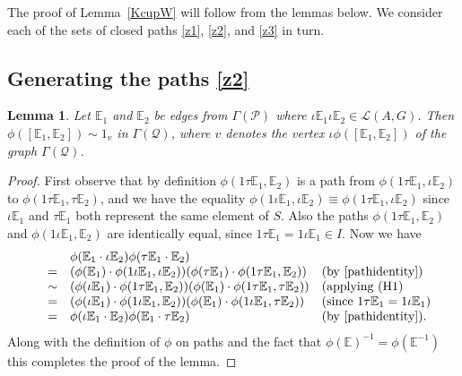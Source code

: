 \documentclass[11pt]{amsart}
\newtheorem{lem}{Lemma}
\theoremstyle{plain}
\begin{document}
The proof of Lemma~\ref{KcupW} will follow from the lemmas below. We consider each of the sets of closed paths \eqref{z1}, \eqref{z2}, and \eqref{z3} in turn.

\subsection*{Generating the paths \eqref{z2}}

\begin{lem}\label{type2}
Let ${\mathbb{E}}_1$ and ${\mathbb{E}}_2$ be edges from $\Gamma(\mathcal{P})$ where $\iota {\mathbb{E}}_1 \iota {\mathbb{E}}_2 \in {\mathcal{L}({A,G})}$. Then  $\phi([{\mathbb{E}}_1, {\mathbb{E}}_2]) \sim 1_v$ in $\Gamma(\mathcal{Q})$,  where $v$ denotes the vertex 
$\iota \phi([{\mathbb{E}}_1, {\mathbb{E}}_2])$ of the graph $\Gamma(\mathcal{Q})$.
\end{lem}
\begin{proof}
First observe that by definition $\phi(1 \tau \mathbb{E}_1, \mathbb{E}_2)$ is a path from $\phi(1 \tau \mathbb{E}_1, \iota \mathbb{E}_2)$ to $\phi(1 \tau \mathbb{E}_1, \tau \mathbb{E}_2)$, and we have the equality
$
\phi(1 \iota \mathbb{E}_1, \iota \mathbb{E}_2) \equiv
\phi(1 \tau \mathbb{E}_1, \iota \mathbb{E}_2)
$
since $\iota \mathbb{E}_1$ and $\tau \mathbb{E}_1$ both represent the same element of $S$. Also the paths
$\phi(1 \tau \mathbb{E}_1, \mathbb{E}_2)$ and
$\phi(1 \iota \mathbb{E}_1, \mathbb{E}_2)$ are identically equal, since $1 \tau \mathbb{E}_1 = 1 \iota \mathbb{E}_1 \in I$.
Now we have
\[
\begin{array}{llll}
 &   & \phi( {\mathbb{E}}_1 \cdot \iota {\mathbb{E}}_2)  \phi ( \tau {\mathbb{E}}_1  \cdot {\mathbb{E}}_2 ) &   \\
& =     &       (\phi( {\mathbb{E}}_1 ) \cdot \phi( 1 \iota {\mathbb{E}}_1, \iota {\mathbb{E}}_2))
                (\phi( \tau {\mathbb{E}}_1) \cdot \phi( 1 \tau {\mathbb{E}}_1, {\mathbb{E}}_2 )) & \mbox{(by \eqref{pathidentity})} \\
& \sim  &       (\phi( \iota {\mathbb{E}}_1 ) \cdot \phi( 1 \tau {\mathbb{E}}_1, {\mathbb{E}}_2))
                (\phi( {\mathbb{E}}_1) \cdot \phi( 1 \tau {\mathbb{E}}_1, \tau {\mathbb{E}}_2 )) & \mbox{(applying (H1)} \\
& =     &        (\phi( \iota {\mathbb{E}}_1 ) \cdot \phi( 1 \iota {\mathbb{E}}_1, {\mathbb{E}}_2))
                (\phi( {\mathbb{E}}_1) \cdot \phi( 1 \iota {\mathbb{E}}_1, \tau {\mathbb{E}}_2 )) & \mbox{(since $1 \tau \mathbb{E}_1 = 1 \iota \mathbb{E}_1$)} \\
& = &           \phi( \iota {\mathbb{E}}_1 \cdot {\mathbb{E}}_2)  \phi ( {\mathbb{E}}_1  \cdot \tau {\mathbb{E}}_2 ) & \mbox{(by \eqref{pathidentity}).}
\end{array}
\]
Along with the definition of $\phi$ on paths and the fact that $\phi({\mathbb{E}})^{-1} = \phi({\mathbb{E}}^{-1})$ this completes the proof of the lemma.
\end{proof}
\end{document}
